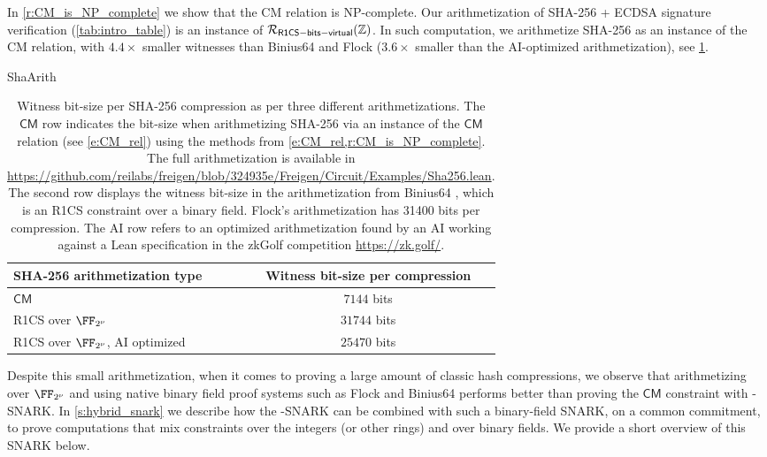 In \cref{r:CM_is_NP_complete} we show that the CM relation is NP-complete. Our arithmetization of SHA-256 + ECDSA signature verification (\cref{tab:intro_table}) is an instance of $\mathcal{R}_{\mathsf{R1CS-bits-virtual}}(\mathbb{Z})$. In such computation, we arithmetize SHA-256 as an instance of the CM relation, with $4.4\times$ smaller witnesses than Binius64 \cite{binius64} and Flock \cite{flock} ($3.6\times$ smaller than the AI-optimized arithmetization), see \cref{tab:sha_arithmetization}.  

\fi


\begin{lncstable}{ShaArith}
\begin{table}[H]
    \centering
    \begin{tabular}{l|c}
        SHA-256 arithmetization type & Witness bit-size per compression  \\ 
        \toprule
        $\mathsf{CM}$ & $7144$ bits \\
        \hline
        R1CS over $\comfield$ &  $31744$ bits
         \\
        \hline
        R1CS over $\comfield$, AI optimized &  $25470$ bits
    \end{tabular}
    \caption{Witness bit-size per SHA-256 compression as per three different arithmetizations. The $\mathsf{CM}$ row indicates the bit-size when arithmetizing SHA-256 via an instance of the $\mathsf{CM}$ relation (see \eqref{e:CM_rel}) using the methods from \cref{e:CM_rel,r:CM_is_NP_complete}\iflncs\else. The full arithmetization  is available in \url{https://github.com/reilabs/freigen/blob/324935e/Freigen/Circuit/Examples/Sha256.lean}\fi. The second row displays the witness bit-size in the  arithmetization from Binius64 \cite{binius64}, which is an R1CS constraint over a binary field. Flock's \cite{flock} arithmetization has 31400 bits per compression. The AI row refers to an optimized arithmetization found by an AI working against a Lean specification in the zkGolf competition \url{https://zk.golf/}.  }
    \label{tab:sha_arithmetization}
\end{table}
\end{lncstable}



Despite this small arithmetization, when it comes to proving a large amount of classic hash compressions, we observe that arithmetizing over $\comfield$ and using native binary field proof systems such as Flock \cite{flock} and Binius64 \cite{binius64} performs better than proving the $\mathsf{CM}$ constraint with \ftwoz-SNARK. In \cref{s:hybrid_snark} we describe how the \ftwoz-SNARK can be combined with such a binary-field SNARK, on a common commitment, to prove computations that mix constraints over the integers (or other rings) and over binary fields. We provide a short overview of this SNARK below. 

